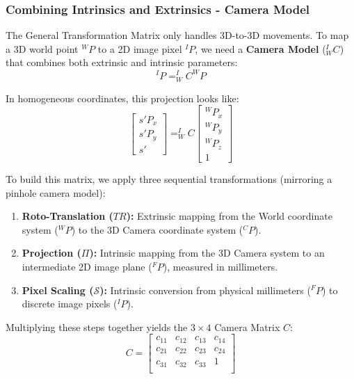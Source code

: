 \subsubsection{Combining Intrinsics and Extrinsics - Camera Model}
The General Transformation Matrix only handles 3D-to-3D movements.
To map a 3D world point $^WP$ to a 2D image pixel $^IP$, we need a \textbf{Camera Model} ($^I_WC$) that combines both extrinsic and intrinsic parameters:
$$ ^IP = ^I_WC ^WP $$

In homogeneous coordinates, this projection looks like:
$$ \begin{bmatrix}
s' P_x \\ s' P_y \\ s'
\end{bmatrix} =
^I_WC \begin{bmatrix}
^WP_x \\ ^WP_y \\ ^WP_z \\ 1
\end{bmatrix} $$

To build this matrix, we apply three sequential transformations (mirroring a pinhole camera model):
\begin{enumerate}
    \item \textbf{Roto-Translation ($TR$):} Extrinsic mapping from the World coordinate system ($^WP$) to the 3D Camera coordinate system ($^CP$).
    \item \textbf{Projection ($\Pi$):} Intrinsic mapping from the 3D Camera system to an intermediate 2D image plane ($^FP$), measured in millimeters.
    \item \textbf{Pixel Scaling ($\mathcal{S}$):} Intrinsic conversion from physical millimeters ($^FP$) to discrete image pixels ($^IP$).
\end{enumerate}

Multiplying these steps together yields the $3 \times 4$ Camera Matrix $C$:
$$ C = \begin{bmatrix}
c_{11} & c_{12} & c_{13} & c_{14} \\
c_{21} & c_{22} & c_{23} & c_{24} \\
c_{31} & c_{32} & c_{33} & 1 \\
\end{bmatrix} $$


